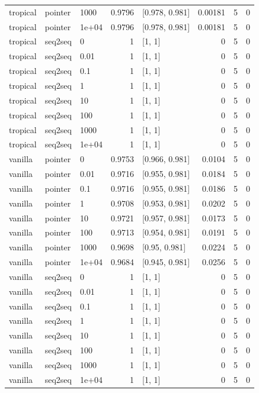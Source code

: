 \documentclass[10pt]{article}
\begin{document}
{\begin{longtable}{lllrlrrr}
tropical & pointer & 1000 & 0.9796 & [0.978, 0.981] & 0.00181 & 5 & 0\\
tropical & pointer & 1e+04 & 0.9796 & [0.978, 0.981] & 0.00181 & 5 & 0\\
tropical & seq2seq & 0 & 1 & [1, 1] & 0 & 5 & 0\\
tropical & seq2seq & 0.01 & 1 & [1, 1] & 0 & 5 & 0\\
tropical & seq2seq & 0.1 & 1 & [1, 1] & 0 & 5 & 0\\
tropical & seq2seq & 1 & 1 & [1, 1] & 0 & 5 & 0\\
tropical & seq2seq & 10 & 1 & [1, 1] & 0 & 5 & 0\\
tropical & seq2seq & 100 & 1 & [1, 1] & 0 & 5 & 0\\
tropical & seq2seq & 1000 & 1 & [1, 1] & 0 & 5 & 0\\
tropical & seq2seq & 1e+04 & 1 & [1, 1] & 0 & 5 & 0\\
vanilla & pointer & 0 & 0.9753 & [0.966, 0.981] & 0.0104 & 5 & 0\\
vanilla & pointer & 0.01 & 0.9716 & [0.955, 0.981] & 0.0184 & 5 & 0\\
vanilla & pointer & 0.1 & 0.9716 & [0.955, 0.981] & 0.0186 & 5 & 0\\
vanilla & pointer & 1 & 0.9708 & [0.953, 0.981] & 0.0202 & 5 & 0\\
vanilla & pointer & 10 & 0.9721 & [0.957, 0.981] & 0.0173 & 5 & 0\\
vanilla & pointer & 100 & 0.9713 & [0.954, 0.981] & 0.0191 & 5 & 0\\
vanilla & pointer & 1000 & 0.9698 & [0.95, 0.981] & 0.0224 & 5 & 0\\
vanilla & pointer & 1e+04 & 0.9684 & [0.945, 0.981] & 0.0256 & 5 & 0\\
vanilla & seq2seq & 0 & 1 & [1, 1] & 0 & 5 & 0\\
vanilla & seq2seq & 0.01 & 1 & [1, 1] & 0 & 5 & 0\\
vanilla & seq2seq & 0.1 & 1 & [1, 1] & 0 & 5 & 0\\
vanilla & seq2seq & 1 & 1 & [1, 1] & 0 & 5 & 0\\
vanilla & seq2seq & 10 & 1 & [1, 1] & 0 & 5 & 0\\
vanilla & seq2seq & 100 & 1 & [1, 1] & 0 & 5 & 0\\
vanilla & seq2seq & 1000 & 1 & [1, 1] & 0 & 5 & 0\\
vanilla & seq2seq & 1e+04 & 1 & [1, 1] & 0 & 5 & 0\\
\bottomrule
\end{longtable}
}
\end{document}
